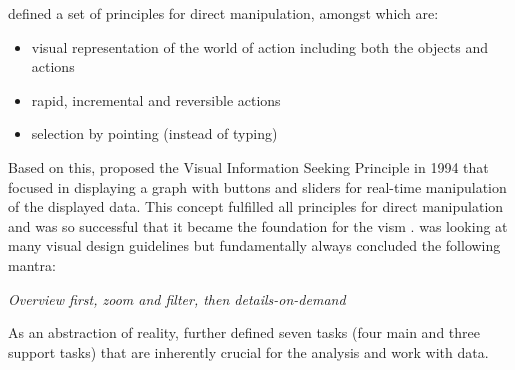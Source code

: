 \label{SubSectionVISM}

\cite{Shneiderman2005} defined a set of principles for direct manipulation, amongst which are:
\begin{itemize}[noitemsep,nolistsep]
	\item visual representation of the world of action including both the objects and actions
	\item rapid, incremental and reversible actions
	\item selection by pointing (instead of typing)
\end{itemize}
Based on this, \cite{Ahlberg1994} proposed the Visual Information Seeking Principle in 1994 that focused in displaying a graph with buttons and sliders for real-time manipulation of the displayed data. This concept fulfilled all principles for direct manipulation and was so successful that it became the foundation for the \gls{vism} \citep{Shneiderman1996}. \cite{Shneiderman1996} was looking at many visual design guidelines but fundamentally always concluded the following mantra:
\begin{framed}
	\textit{Overview first, zoom and filter, then details-on-demand}
\end{framed}
As an abstraction of reality, \cite{Shneiderman1996} further defined seven tasks (four main and three support tasks) that are inherently crucial for the analysis and work with data.

